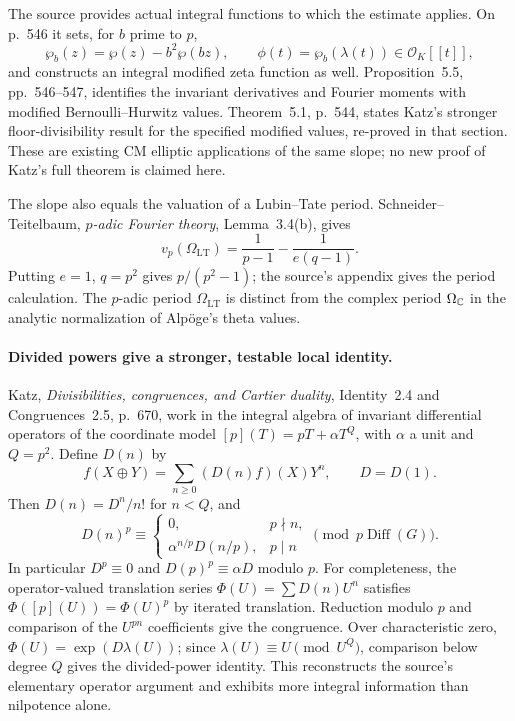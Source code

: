 The source provides actual integral functions to which the estimate
applies. On p.~546 it sets, for $b$ prime to $p$,
\[
 \wp_b(z)=\wp(z)-b^2\wp(bz),\qquad
 \phi(t)=\wp_b(\lambda(t))\in\mathcal O_K[[t]],
\]
and constructs an integral modified zeta function as well.
Proposition~5.5, pp.~546--547, identifies the invariant derivatives
and Fourier moments with modified Bernoulli--Hurwitz values.
Theorem~5.1, p.~544, states Katz's stronger floor-divisibility
result for the specified modified values, re-proved in that section.
These are existing CM elliptic applications of the same slope; no
new proof of Katz's full theorem is claimed here.

The slope also equals the valuation of a Lubin--Tate period.
Schneider--Teitelbaum, \emph{$p$-adic Fourier theory},
Lemma~3.4(b), gives
\[
 v_p(\Omega_{\mathrm{LT}})=\frac1{p-1}-\frac1{e(q-1)}.
\]
Putting $e=1$, $q=p^2$ gives $p/(p^2-1)$; the source's appendix
gives the period calculation. The $p$-adic period
$\Omega_{\mathrm{LT}}$ is distinct from the complex period
$\Omega_{\mathbb C}$ in the analytic normalization of Alp\"oge's theta
values.

\paragraph{Divided powers give a stronger, testable local identity.}
Katz, \emph{Divisibilities, congruences, and Cartier duality},
Identity~2.4 and Congruences~2.5, p.~670, work in the integral
algebra of invariant differential operators of the coordinate model
$[p](T)=pT+\alpha T^{Q}$, with $\alpha$ a unit and $Q=p^2$.
Define $D(n)$ by
\[
 f(X\mathbin\oplus Y)=\sum_{n\geq0}(D(n)f)(X)Y^n,
 \qquad D=D(1).
\]
Then $D(n)=D^n/n!$ for $n<Q$, and
\[
 D(n)^p\equiv
 \begin{cases}
 0,&p\nmid n,\\
 \alpha^{n/p}D(n/p),&p\mid n
 \end{cases}
 \pmod{p\operatorname{Diff}(G)}.
\]
In particular $D^p\equiv0$ and $D(p)^p\equiv\alpha D$ modulo $p$.
For completeness, the operator-valued translation series
$\Phi(U)=\sum D(n)U^n$ satisfies
$\Phi([p](U))=\Phi(U)^p$ by iterated translation.
Reduction modulo $p$ and comparison of the $U^{pn}$ coefficients
give the congruence. Over characteristic zero,
$\Phi(U)=\exp(D\lambda(U))$; since
$\lambda(U)\equiv U\pmod{U^Q}$, comparison below degree $Q$
gives the divided-power identity. This reconstructs the source's
elementary operator argument and exhibits more integral information
than nilpotence alone.

